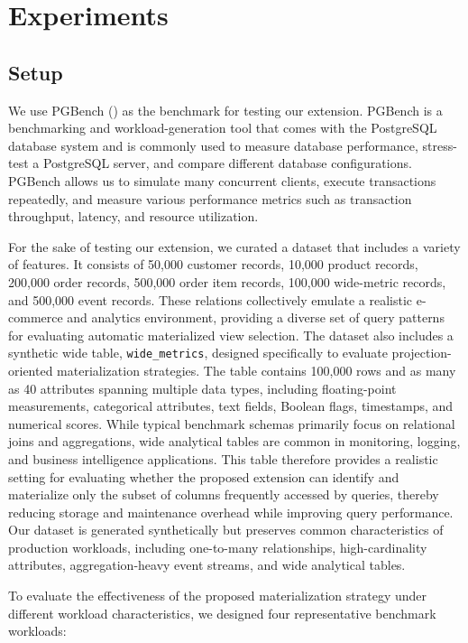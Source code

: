 \section{Experiments}

\subsection{Setup}

We use PGBench (\textcite{pgbench}) as the benchmark for testing our extension. PGBench is a benchmarking and workload-generation tool that comes with the PostgreSQL database system and is commonly used to measure database performance, stress-test a PostgreSQL server, and compare different database configurations. PGBench allows us to simulate many concurrent clients, execute transactions repeatedly, and measure various performance metrics such as transaction throughput, latency, and resource utilization.

For the sake of testing our extension, we curated a dataset that includes a variety of features. It consists of 50,000 customer records, 10,000 product records, 200,000 order records, 500,000 order item records, 100,000 wide-metric records, and 500,000 event records. These relations collectively emulate a realistic e-commerce and analytics environment, providing a diverse set of query patterns for evaluating automatic materialized view selection. The dataset also includes a synthetic wide table, \texttt{wide\_metrics}, designed specifically to evaluate projection-oriented materialization strategies. The table contains 100,000 rows and as many as 40 attributes spanning multiple data types, including floating-point measurements, categorical attributes, text fields, Boolean flags, timestamps, and numerical scores. While typical benchmark schemas primarily focus on relational joins and aggregations, wide analytical tables are common in monitoring, logging, and business intelligence applications. This table therefore provides a realistic setting for evaluating whether the proposed extension can identify and materialize only the subset of columns frequently accessed by queries, thereby reducing storage and maintenance overhead while improving query performance. Our dataset is generated synthetically but preserves common characteristics of production workloads, including one-to-many relationships, high-cardinality attributes, aggregation-heavy event streams, and wide analytical tables.

To evaluate the effectiveness of the proposed materialization strategy under different workload characteristics, we designed four representative benchmark workloads:

